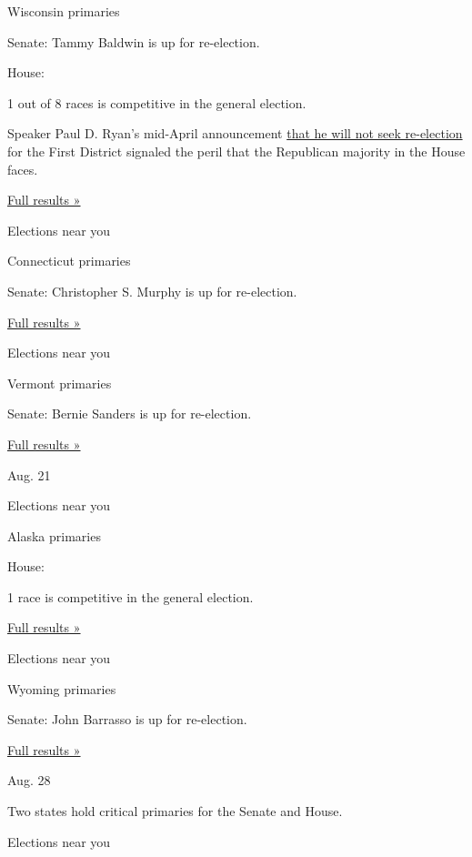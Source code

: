 Wisconsin primaries

Senate: Tammy Baldwin is up for re-election.

House:

1 out of 8 races is competitive in the general election.

Speaker Paul D. Ryan's mid-April announcement
\href{https://www.nytimes3xbfgragh.onion/2018/04/11/us/politics/paul-ryan-speaker.html}{that
he will not seek re-election} for the First District signaled the peril
that the Republican majority in the House faces.

\href{https://www.nytimes3xbfgragh.onion/interactive/2018/08/14/us/elections/results-wisconsin-primary-elections.html}{Full
results »}

Elections near you

Connecticut primaries

Senate: Christopher S. Murphy is up for re-election.

\href{https://www.nytimes3xbfgragh.onion/interactive/2018/08/14/us/elections/results-connecticut-primary-elections.html}{Full
results »}

Elections near you

Vermont primaries

Senate: Bernie Sanders is up for re-election.

\href{https://www.nytimes3xbfgragh.onion/interactive/2018/08/14/us/elections/results-vermont-primary-elections.html}{Full
results »}

Aug. 21

Elections near you

Alaska primaries

House:

1 race is competitive in the general election.

\href{https://www.nytimes3xbfgragh.onion/interactive/2018/08/21/us/elections/results-alaska-primary-elections.html}{Full
results »}

Elections near you

Wyoming primaries

Senate: John Barrasso is up for re-election.

\href{https://www.nytimes3xbfgragh.onion/interactive/2018/08/21/us/elections/results-wyoming-primary-elections.html}{Full
results »}

Aug. 28

Two states hold critical primaries for the Senate and House.

Elections near you

